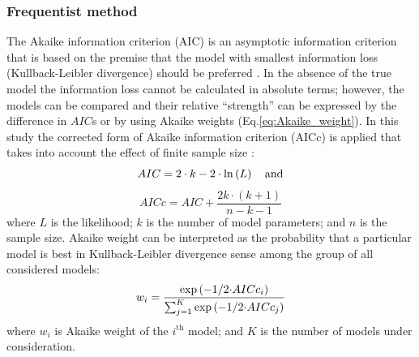 \subsubsection*{Frequentist method}
The Akaike information criterion (AIC) is an asymptotic information criterion that is based on the premise that the model with smallest information loss (Kullback-Leibler divergence) should be preferred \citep{Akaike1973, Wit2012}. In the absence of the true model the information loss cannot be calculated in absolute terms; however, the models can be compared and their relative ``strength'' can be expressed by the difference in $AIC$s or by using Akaike weights (Eq.\ref{eq:Akaike_weight}). In this study the corrected form of Akaike information criterion (AICc) is applied that takes into account the effect of finite sample size \citep{Burnham2002}:
\begin{equation}
\label{eq:AIC}
	{AIC} = 2 \cdot k - 2 \cdot \ln \left( L \right)  \textrm{\quad and}
\end{equation}
\begin{equation}
\label{eq:AICc}
	{AICc} = {AIC} + \frac{{2k \cdot (k + 1)}}{{n - k - 1}}
\end{equation}
where $L$ is the likelihood; $k$ is the number of model parameters; and $n$ is the sample size. Akaike weight can be interpreted as the probability that a particular model is best in Kullback-Leibler divergence sense among the group of all considered models:
\begin{equation}
\label{eq:Akaike_weight}
	{w_i} = \frac{{\exp \left( {{{ - 1} \mathord{\left/
	 {\vphantom {{ - 1} {2 \cdot }}} \right.
	 \kern-\nulldelimiterspace} {2 \cdot }}AIC{c_i}} \right)}}{{\sum\nolimits_{j = 1}^K {\exp \left( {{{ - 1} \mathord{\left/
	 {\vphantom {{ - 1} {2 \cdot }}} \right.
	 \kern-\nulldelimiterspace} {2 \cdot }}AIC{c_j}} \right)} }}
\end{equation}
where $w_i$ is Akaike weight of the $i^\mathrm{th}$ model; and $K$ is the number of models under consideration.


